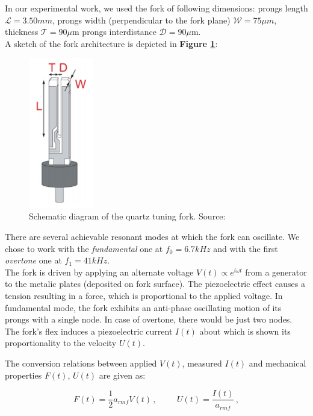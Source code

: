 In our experimental work, we used the fork of following dimensions: prongs length $ \mathcal{L} = 3.50\unit{mm} $, prongs width (perpendicular to the fork plane) $ \mathcal{W}=75 \mu\unit{m} $, thickness $ \mathcal{T}=90\mu\text{m} $ prongs interdistance $ \mathcal{D}=90\mu\text{m} $.\\
A sketch of the fork architecture is depicted in \textbf{Figure \ref{fork}}:

\begin{figure}[h]
	\centering
	\includegraphics[width=0.25\textwidth]{graphics/exp/quartz}
	\caption{Schematic diagram of the quartz tuning fork. Source: \cite{bakalaris}}
	\label{fork}
\end{figure}

There are several achievable resonant modes at which the fork can oscillate. We chose to work with the \textit{fundamental} one at $f_0 = 6.7 \unit{kHz}$ and with the first \textit{overtone} one at $f_1 = 41 \unit{kHz}$.\\
The fork is driven by applying an alternate voltage $V(t) \propto e^{i\omega t}$ from a generator to the metalic plates (deposited on fork surface). The piezoelectric effect causes a tension resulting in a force, which is proportional to the applied voltage. In fundamental mode, the fork exhibits an anti-phase oscillating motion of its prongs with a single node. In case of overtone, there would be just two nodes. The fork's flex induces a piezoelectric current $I(t)$ about which is shown its proportionality to the velocity $U(t)$.

\newpage

The conversion relations between applied $V(t)$, measured $I(t)$ and mechanical properties $F(t)$, $U(t)$ are given \cite{fork} as:

\begin{equation}
F(t) = \frac{1}{2} a_{rmf} V(t)\,,
\hspace{1cm}
U(t) = \frac{I(t)}{a_{rmf}}\,,
\end{equation}

